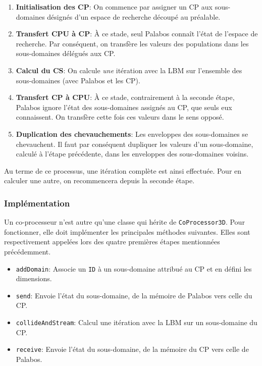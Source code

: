 \begin{enumerate}
\item \textbf{Initialisation des \ac{CP}}: On commence par assigner un \ac{CP} aux sous-domaines désignés d'un espace de recherche découpé au préalable.
\item \textbf{Transfert \ac{CPU} à \ac{CP}}: À ce stade, seul Palabos connaît l'état de l'espace de recherche. Par conséquent, on transfère les valeurs des populations dans les sous-domaines délégués aux \ac{CP}.
\item \textbf{Calcul du \ac{CS}}: On calcule \textit{une} itération avec la \ac{LBM} sur l'ensemble des sous-domaines (avec Palabos et les \ac{CP}).
\item \textbf{Transfert \ac{CP} à \ac{CPU}}: À ce stade, contrairement à la seconde étape, Palabos ignore l'état des sous-domaines assignés au \ac{CP}, que seuls eux connaissent. On transfère cette fois ces valeurs dans le sens opposé.
\item \textbf{Duplication des chevauchements}:  Les enveloppes des sous-domaines se chevauchent. Il faut par conséquent dupliquer les valeurs d'un sous-domaine, calculé à l'étape précédente, dans les enveloppes des sous-domaines voisins.
\end{enumerate}

Au terme de ce processus, une itération complète est ainsi effectuée. Pour en calculer une autre, on recommencera depuis la seconde étape. 

\subsubsection{Implémentation}
Un co-processeur n'est autre qu'une classe qui hérite de \texttt{CoProcessor3D}. Pour fonctionner, elle doit implémenter les principales méthodes suivantes. Elles sont respectivement appelées lors des quatre premières étapes mentionnées précédemment.

\begin{itemize}
\item \texttt{addDomain}: Associe un \texttt{ID} à un sous-domaine attribué au \ac{CP} et en défini les dimensions.
\item \texttt{send}: Envoie l'état du sous-domaine, de la mémoire de Palabos vers celle du \ac{CP}.
\item \texttt{collideAndStream}: Calcul une itération avec la \ac{LBM} sur un sous-domaine du \ac{CP}.
\item \texttt{receive}: Envoie l'état du sous-domaine, de la mémoire du \ac{CP} vers celle de Palabos.
\end{itemize}

